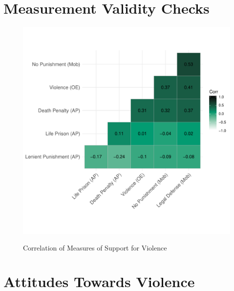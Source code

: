 \documentclass[]{article}
\begin{document}
\newpage

\section{Measurement Validity Checks}

\begin{figure}[H]
  \centering
  \caption{Correlation of Measures of Support for Violence}
  \vspace{1em}
  \includegraphics[width=.7\textwidth]{figures/corr_plot.pdf}\\
\end{figure}





%
%
%


\section{Attitudes Towards Violence}\vspace{-1em}
\end{document}
